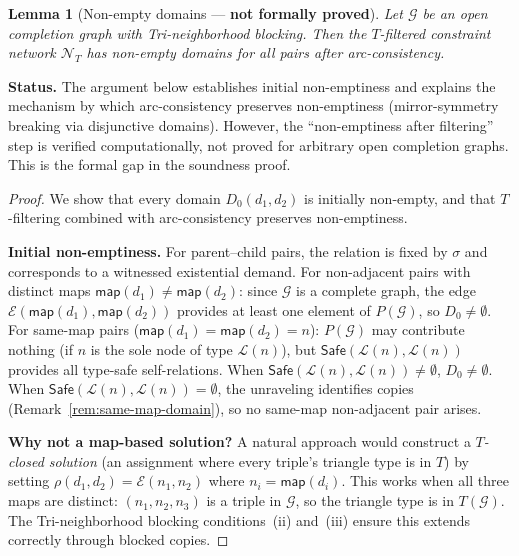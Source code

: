 \documentclass[a4paper,11pt]{article}
\newtheorem{lemma}[theorem]{Lemma}
\theoremstyle{definition}
\newcommand{\Safe}{\ensuremath{\mathsf{Safe}}}
\newcommand{\GG}{\ensuremath{\mathcal{G}}}
\newcommand{\LL}{\ensuremath{\mathcal{L}}}
\newcommand{\EE}{\ensuremath{\mathcal{E}}}
\newcommand{\NN}{\ensuremath{\mathcal{N}}}
\begin{document}
\begin{lemma}[Non-empty domains --- \textbf{not formally proved}]
\label{lem:tclosed-exist}
Let $\GG$ be an open completion graph with Tri-neighborhood
blocking.  Then the $T$-filtered constraint network $\NN_T$
has non-empty domains for all pairs after arc-consistency.
\end{lemma}

\noindent
\textbf{Status.}\; The argument below establishes initial
non-emptiness and explains the mechanism by which arc-consistency
preserves non-emptiness (mirror-symmetry breaking via disjunctive
domains).  However, the ``non-emptiness after filtering'' step is
verified computationally, not proved for arbitrary open completion
graphs.  This is the formal gap in the soundness proof.

\begin{proof}
We show that every domain $D_0(d_1, d_2)$ is initially
non-empty, and that $T$-filtering combined with arc-consistency
preserves non-emptiness.

\medskip\noindent\textbf{Initial non-emptiness.}\;
For parent--child pairs, the relation is fixed by $\sigma$
and corresponds to a witnessed existential demand.
For non-adjacent pairs with distinct maps
$\mathsf{map}(d_1) \neq \mathsf{map}(d_2)$: since $\GG$
is a complete graph, the edge $\EE(\mathsf{map}(d_1),
\mathsf{map}(d_2))$ provides at least one element of
$P(\GG)$, so $D_0 \neq \emptyset$.
For same-map pairs ($\mathsf{map}(d_1) = \mathsf{map}(d_2)
= n$): $P(\GG)$ may contribute nothing (if $n$ is the sole
node of type $\LL(n)$), but $\Safe(\LL(n), \LL(n))$ provides
all type-safe self-relations.  When $\Safe(\LL(n), \LL(n))
\neq \emptyset$, $D_0 \neq \emptyset$.  When
$\Safe(\LL(n), \LL(n)) = \emptyset$, the
unraveling identifies copies
(Remark~\ref{rem:same-map-domain}), so no same-map
non-adjacent pair arises.

\medskip\noindent\textbf{Why not a map-based solution?}\;
A natural approach would construct a \emph{$T$-closed solution}
(an assignment where every triple's triangle type is in $T$)
by setting $\rho(d_1, d_2) = \EE(n_1, n_2)$ where $n_i =
\mathsf{map}(d_i)$.  This works when all three maps are
distinct: $(n_1, n_2, n_3)$ is a triple in $\GG$, so the
triangle type is in $T(\GG)$.  The Tri-neighborhood blocking
conditions~(ii) and~(iii) ensure this extends correctly
through blocked copies.


\end{proof}
\end{document}
